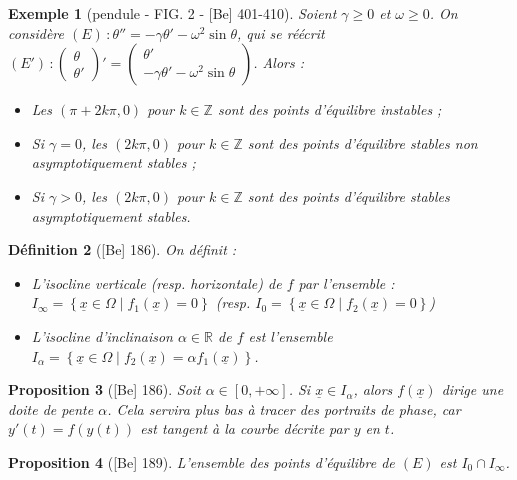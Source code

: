 \documentclass[10pt, a4paper, parskip=full, twoside, twocolumn]{report}
\newtheorem{definition}{Définition}
\newtheorem{proposition}[definition]{Proposition}
\newtheorem{example}[definition]{Exemple}
\newcommand{\IZ}{\mathbb{Z}}
\newcommand{\IR}{\mathbb{R}}
\begin{document}
\begin{example}[pendule - FIG. 2 - \textnormal{[Be] 401-410}]
	Soient $\gamma \geq 0$ et $\omega \geq 0$. On considère $(E)\,\colon \theta''=-\gamma\theta' - \omega^2\sin \theta$,
	qui se réécrit $(E')\,\colon \begin{pmatrix}
		\theta \\ \theta'
	\end{pmatrix}' = \begin{pmatrix}
		\theta' \\ -\gamma\theta'-\omega^2\sin \theta
	\end{pmatrix}$. Alors :
	\begin{itemize}
		\item Les $(\pi+2k\pi, 0)$ pour $k\in \IZ$ sont des points d'équilibre instables ;
		\item Si $\gamma = 0$, les $(2k\pi, 0)$ pour $k\in\IZ$ sont des points d'équilibre stables non asymptotiquement stables ;
		\item Si $\gamma > 0$, les $(2k\pi, 0)$ pour $k\in\IZ$ sont des points d'équilibre stables asymptotiquement stables.
	\end{itemize}
\end{example}

\begin{definition}[\textnormal{[Be] 186}]
	On définit :
	\begin{itemize}
		\item L'\emph{isocline verticale} (resp. \emph{horizontale}) de $f$ par l'ensemble : $I_{\infty} = \left\{\underline{x}\in \Omega\mid f_1(\underline{x}) = 0\right\}$ (resp. $I_0 = \left\{\underline{x}\in\Omega \mid f_2(\underline{x}) = 0\right\}$)
		\item L'\emph{isocline d'inclinaison $\alpha\in \IR$ de $f$} est l'ensemble $I_{\alpha} = \left\{\underline{x}\in\Omega\mid f_2(\underline{x}) = \alpha f_1(\underline{x})\right\}$.
	\end{itemize}
\end{definition}

\begin{proposition}[\textnormal{[Be] 186}]
	Soit $\alpha\in [0,+\infty]$. Si $\underline{x}\in I_{\alpha}$, alors $f(\underline{x})$ dirige une doite de pente $\alpha$.
	Cela servira plus bas à tracer des portraits de phase, car $y'(t) = f(y(t))$ est tangent à la courbe décrite par $y$ en $t$.
\end{proposition}

\begin{proposition}[\textnormal{[Be] 189}]
	L'ensemble des points d'équilibre de $(E)$ est $I_0\cap I_{\infty}$.
\end{proposition}
\end{document}
